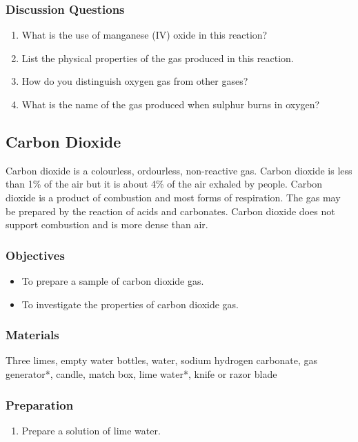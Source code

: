 \subsubsection*{Discussion Questions}
\begin{enumerate}
\item{What is the use of manganese (IV) oxide in this reaction?}
\item{List the physical properties of the gas produced in this reaction.}
\item{How do you distinguish oxygen gas from other gases?}
\item{What is the name of the gas produced when sulphur burns in oxygen?}
\end{enumerate}

\subsection{Carbon Dioxide}

Carbon dioxide is a colourless, ordourless, non-reactive gas. Carbon dioxide is less than 1\% of the air but it is about 4\% of the air exhaled by people. Carbon dioxide is a product of combustion and most forms of respiration. The gas may be prepared by the reaction of acids and carbonates. Carbon dioxide does not support combustion and is more dense than air.

\subsubsection*{Objectives}
\begin{itemize}
\item{To prepare a sample of carbon dioxide gas.}
\item{To investigate the properties of carbon dioxide gas.}
\end{itemize}

\subsubsection*{Materials}
Three limes, empty water bottles, water, sodium hydrogen carbonate, gas generator*, candle, match box, lime water*, knife or razor blade

\subsubsection*{Preparation}
\begin{enumerate}
\item{Prepare a solution of lime water.}
\end{enumerate}

